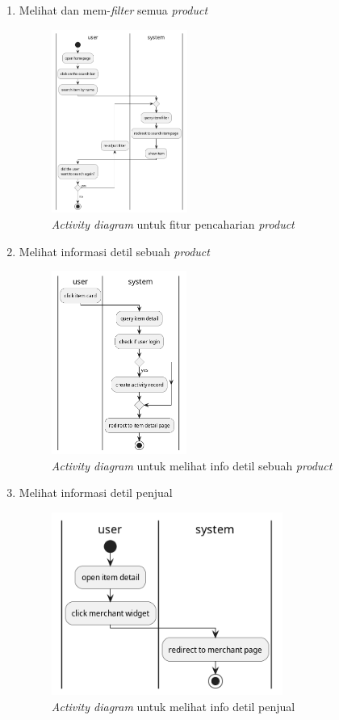 \documentclass[a4paper]{article}
\begin{document}
\begin{enumerate}
\begin{enumerate}
        \item Melihat dan mem-\textit{filter} semua \textit{product}
        \begin{figure}[h]
            \centering
            \includegraphics*[height=6cm]{./diagram/activity diagram/9. search item/search item.png}
            \caption{\textit{Activity diagram} untuk fitur pencaharian \textit{product}}
        \end{figure}
        \item Melihat informasi detil sebuah \textit{product}
        \begin{figure}[h]
            \centering
            \includegraphics*[height=6cm]{./diagram/activity diagram/10. see item detail/see item detail.png}
            \caption{\textit{Activity diagram} untuk melihat info detil sebuah \textit{product}}
        \end{figure}
        \newpage

        \item Melihat informasi detil penjual
        \begin{figure}[h]
            \centering
            \includegraphics*[height=6cm]{./diagram/activity diagram/11. view merchant page/view merchant page.png}
            \caption{\textit{Activity diagram} untuk melihat info detil penjual}
        \end{figure}


\end{enumerate}
\end{enumerate}
\end{document}
